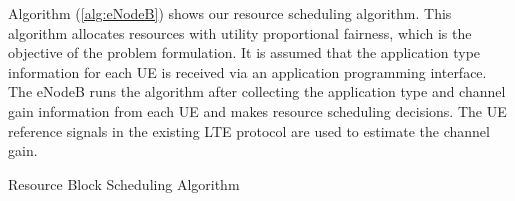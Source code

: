 \documentclass[journal]{IEEEtran} 				\IEEEoverridecommandlockouts 	\usepackage{amsmath,amssymb}
\begin{document}
Algorithm (\ref{alg:eNodeB}) shows our resource scheduling algorithm. This algorithm allocates resources with utility proportional fairness, which is the objective of the problem formulation. It is assumed that the application type information for each UE is received via an application programming interface. The eNodeB runs the algorithm after collecting the application type and channel gain information from each UE and makes resource scheduling decisions. The UE reference signals in the existing LTE protocol are used to estimate the channel gain.   

\begin{algorithm}
\caption{Resource Block Scheduling Algorithm}\label{alg:eNodeB}
\begin{algorithmic}
	 \\
	 \\
\ENDIF 
\ENDFOR
\end{algorithmic}
\end{algorithm}
\end{document}
